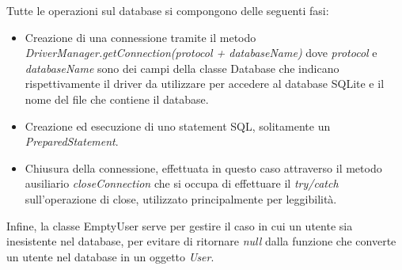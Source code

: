 Tutte le operazioni sul database si compongono delle seguenti fasi:
\begin{itemize}
    \item Creazione di una connessione tramite il metodo\\
    \textit{DriverManager.getConnection(protocol + databaseName)} dove \textit{protocol} e \textit{databaseName}
    sono dei campi della classe Database che indicano rispettivamente il driver da utilizzare per accedere
    al database SQLite e il nome del file che contiene il database.
    \item Creazione ed esecuzione di uno statement SQL, solitamente un \textit{PreparedStatement}.
    \item Chiusura della connessione, effettuata in questo caso attraverso il metodo ausiliario \textit{closeConnection}
    che si occupa di effettuare il \textit{try/catch} sull'operazione di close, utilizzato principalmente per leggibilità.
\end{itemize}

Infine, la classe EmptyUser serve per gestire il caso in cui un utente sia inesistente nel database,
per evitare di ritornare \textit{null}\cite{CleanCode} dalla funzione che converte un utente nel database in un oggetto \textit{User}.
